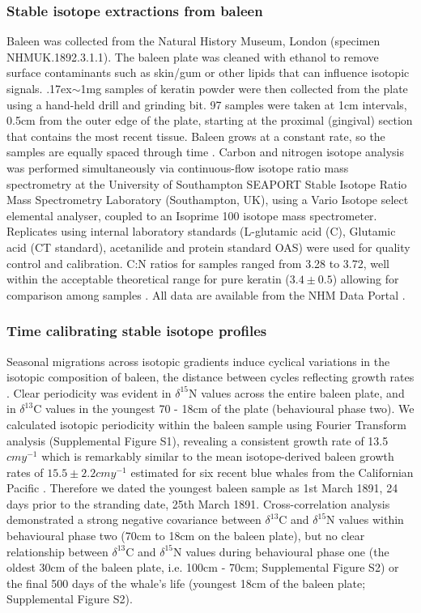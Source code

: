 \documentclass[a4paper,12pt]{article}
\begin{document}
\subsubsection{Stable isotope extractions from baleen}
Baleen was collected from the Natural History Museum, London (specimen NHMUK.1892.3.1.1). 
The baleen plate was cleaned with ethanol to remove surface contaminants such as skin/gum or other lipids that can influence isotopic signals. 
{\raise.17ex\hbox{$\scriptstyle\sim$}}1mg samples of keratin powder were then collected from the plate using a hand-held drill and grinding bit. 
97 samples were taken at 1cm intervals, 0.5cm from the outer edge of the plate, starting at the proximal (gingival) section that contains the most recent tissue. 
Baleen grows at a constant rate, so the samples are equally spaced through time \cite{best1996stable}. 
Carbon and nitrogen isotope analysis was performed simultaneously via continuous-flow isotope ratio mass spectrometry at the University of Southampton SEAPORT Stable Isotope Ratio Mass Spectrometry Laboratory (Southampton, UK), using a Vario Isotope select elemental analyser, coupled to an Isoprime 100 isotope mass spectrometer. 
Replicates using internal laboratory standards (L-glutamic acid (C), Glutamic acid (CT standard), acetanilide and protein standard OAS) were used for quality control and calibration. 
C:N ratios for samples ranged from 3.28\text{\textperthousand} to 3.72\text{\textperthousand}, well within the acceptable theoretical range for pure keratin ($3.4\pm0.5$) allowing for comparison among samples \cite{hobson1998stable}. 
All data are available from the NHM Data Portal \cite{data-set}.
 
\subsubsection{Time calibrating stable isotope profiles}
Seasonal migrations across isotopic gradients induce cyclical variations in the isotopic composition of baleen, the distance between cycles reflecting growth rates \cite{hobson1998stable,busquets2017estimating}. 
Clear periodicity was evident in $\delta^{15}$N values across the entire baleen plate, and in $\delta^{13}$C values in the youngest 70 - 18cm of the plate (behavioural phase two). 
We calculated isotopic periodicity within the baleen sample using Fourier Transform analysis \cite{cardona2017temporal} (Supplemental Figure S1), revealing a consistent growth rate of 13.5$cmy^{-1}$ which is remarkably similar to the mean isotope-derived baleen growth rates of $15.5 \pm 2.2cmy^{-1}$ estimated for six recent blue whales from the Californian Pacific \cite{busquets2017estimating}.  
Therefore we dated the youngest baleen sample as 1st March 1891, 24 days prior to the stranding date, 25th March 1891. 
Cross-correlation analysis demonstrated a strong negative covariance between $\delta^{13}$C and $\delta^{15}$N values within behavioural phase two (70cm to 18cm on the baleen plate), but no clear relationship between $\delta^{13}$C and $\delta^{15}$N values during behavioural phase one (the oldest 30cm of the baleen plate, i.e. 100cm - 70cm; Supplemental Figure S2) or the final 500 days of the whale's life (youngest 18cm of the baleen plate; Supplemental Figure S2).
 
\end{document}

